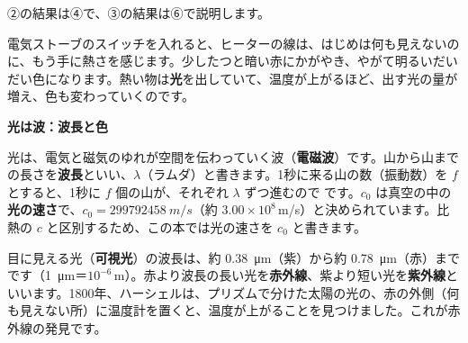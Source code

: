 \noindent ②の結果は④で、③の結果は⑥で説明します。

\begin{omoidasou}
\end{omoidasou}




\leavevmode\label{ph:熱-13:sec1}電気ストーブのスイッチを入れると、ヒーターの線は、はじめは何も見えないのに、もう手に熱さを感じます。少したつと暗い赤にかがやき、やがて明るいだいだい色になります。熱い物は\textbf{光}を出していて、温度が上がるほど、出す光の量が増え、色も変わっていくのです。

\noindent\textbf{光は波：波長と色}\par\nobreak
光は、電気と磁気のゆれが空間を伝わっていく波（\textbf{電磁波}）です。山から山までの長さを\textbf{波長}といい、$\lambda$（ラムダ）と書きます。1秒に来る山の数（振動数）を $f$ とすると、1秒に $f$ 個の山が、それぞれ $\lambda$ ずつ進むので
です。$c_0$ は真空の中の\textbf{光の速さ}で、$c_0=\qty{299792458}{m/s}$（約 $3.00\times10^8$\,m/s）と決められています。比熱の $c$ と区別するため、この本では光の速さを $c_0$ と書きます。

目に見える光（\textbf{可視光}）の波長は、約 \qty{0.38}{\micro m}（紫）から約 \qty{0.78}{\micro m}（赤）までです（\qty{1}{\micro m}＝$10^{-6}$\,m）。赤より波長の長い光を\textbf{赤外線}、紫より短い光を\textbf{紫外線}といいます。1800年、ハーシェルは、プリズムで分けた太陽の光の、赤の外側（何も見えない所）に温度計を置くと、温度が上がることを見つけました。これが赤外線の発見です。

